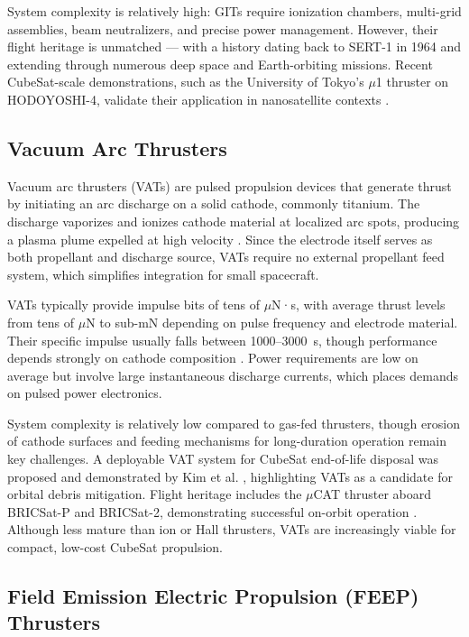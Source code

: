 System complexity is relatively high: GITs require ionization chambers, multi-grid assemblies, beam neutralizers, and precise power management. However, their flight heritage is unmatched — with a history dating back to SERT-1 in 1964 and extending through numerous deep space and Earth-orbiting missions. Recent CubeSat-scale demonstrations, such as the University of Tokyo’s $\mu$1 thruster on HODOYOSHI-4, validate their application in nanosatellite contexts \cite{alnaqbi-propulsion_summary}.

\subsection{Vacuum Arc Thrusters}

Vacuum arc thrusters (VATs) are pulsed propulsion devices that generate thrust by initiating an arc discharge on a solid cathode, commonly titanium. The discharge vaporizes and ionizes cathode material at localized arc spots, producing a plasma plume expelled at high velocity \cite{schein-vat}. Since the electrode itself serves as both propellant and discharge source, VATs require no external propellant feed system, which simplifies integration for small spacecraft.

VATs typically provide impulse bits of tens of $\mu$N·s, with average thrust levels from tens of $\mu$N to sub-mN depending on pulse frequency and electrode material. Their specific impulse usually falls between 1000–3000~s, though performance depends strongly on cathode composition \cite{chowdhury-vat}. Power requirements are low on average but involve large instantaneous discharge currents, which places demands on pulsed power electronics. 

System complexity is relatively low compared to gas-fed thrusters, though erosion of cathode surfaces and feeding mechanisms for long-duration operation remain key challenges. A deployable VAT system for CubeSat end-of-life disposal was proposed and demonstrated by Kim et al. \cite{kim-vat}, highlighting VATs as a candidate for orbital debris mitigation. Flight heritage includes the $\mu$CAT thruster aboard BRICSat-P and BRICSat-2, demonstrating successful on-orbit operation \cite{schein-vat}. Although less mature than ion or Hall thrusters, VATs are increasingly viable for compact, low-cost CubeSat propulsion.


\subsection{Field Emission Electric Propulsion (FEEP) Thrusters}

